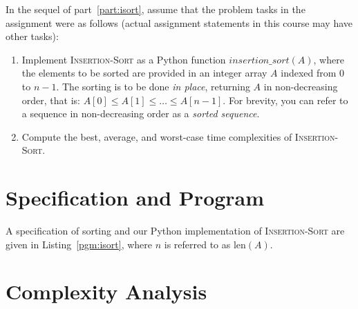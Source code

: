\documentclass[a4paper,11pt]{article}
\newcommand{\length}[1]{\text{len}(#1)}
\newcommand{\twodots}{\mathinner{\ldotp\ldotp}}  %
\newcommand{\handpoint}{\ding{43}}
\begin{document}
\medskip

In the sequel of part~\ref{part:isort}, assume that the problem tasks in
the assignment were as follows (actual assignment statements in this
course may have other tasks):
\begin{enumerate}
\renewcommand{\theenumi}{\Alph{enumi}}
\item Implement \textsc{Insertion-Sort} as a Python function
  $\mathit{insertion\_sort}(A)$, where the elements to be sorted are
  provided in an integer array $A$ indexed from $0$ to $n-1$.  The
  sorting is to be done \emph{in place}, returning $A$ in
  non-decreasing order, that is:
  $A[0] \leq A[1] \leq \dots \leq A[n-1]$.  For brevity, you can refer
  to a sequence in non-decreasing order as a \emph{sorted sequence}.
\item Compute the best, average, and worst-case time complexities of
  \textsc{Insertion-Sort}.
\end{enumerate}

\section{Specification and Program}
\label{sec:pgm:isort}

A specification of sorting and our Python implementation of
\textsc{Insertion-Sort} are given in Listing~\ref{pgm:isort}, where
$n$ is referred to as $\length{A}$.



\section{Complexity Analysis}
\label{sec:analysis:isort}
\end{document}

